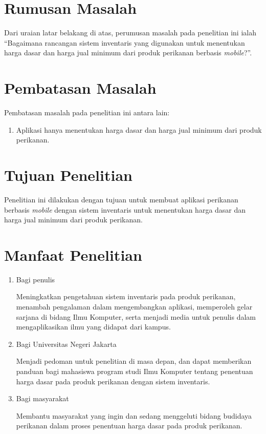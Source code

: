 \section{Rumusan Masalah}
Dari uraian latar belakang di atas, perumusan masalah pada penelitian ini ialah “Bagaimana rancangan sistem inventaris yang digunakan untuk menentukan harga dasar dan harga jual minimum dari produk perikanan berbasis \textit{mobile}?”.

\section{Pembatasan Masalah}
Pembatasan masalah pada penelitian ini antara lain:
\begin{enumerate}
	\item Aplikasi hanya menentukan harga dasar dan harga jual minimum dari produk perikanan.
\end{enumerate}

\section{Tujuan Penelitian}
	Penelitian ini dilakukan dengan tujuan untuk membuat aplikasi perikanan berbasis \textit{mobile} dengan sistem inventaris untuk menentukan harga dasar dan harga jual minimum dari produk perikanan.

\section{Manfaat Penelitian}
\begin{enumerate}
	\item Bagi penulis
		
	Meningkatkan pengetahuan sistem inventaris pada produk perikanan, menambah pengalaman dalam mengembangkan aplikasi, memperoleh gelar sarjana di bidang Ilmu Komputer, serta menjadi media untuk penulis dalam mengaplikasikan ilmu yang didapat dari kampus.
		
	\item Bagi Universitas Negeri Jakarta
	 	
	Menjadi pedoman untuk penelitian di masa depan, dan dapat memberikan panduan bagi mahasiswa program studi Ilmu Komputer tentang penentuan harga dasar pada produk perikanan dengan sistem inventaris.
	
	\item Bagi masyarakat
	 	
	Membantu masyarakat yang ingin dan sedang menggeluti bidang budidaya perikanan dalam proses penentuan harga dasar pada produk perikanan.
	 			
\end{enumerate}


\begin{comment}

\end{comment}
